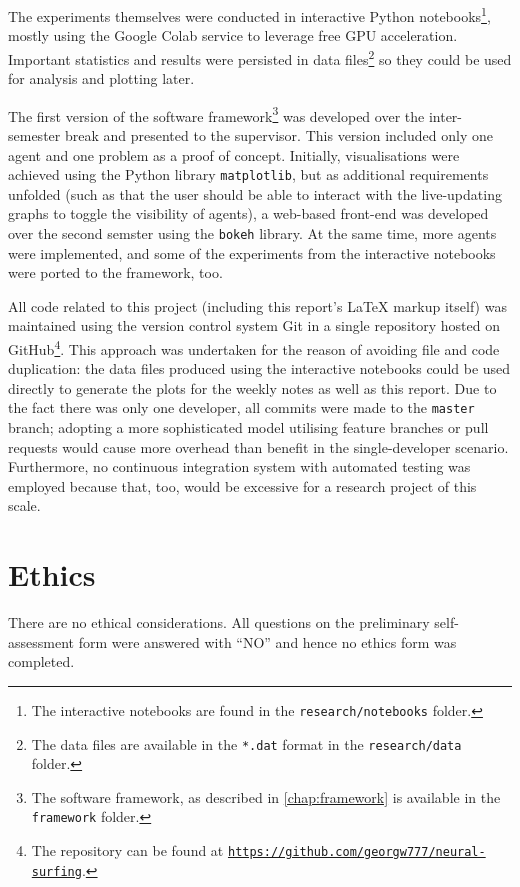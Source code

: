 The experiments themselves were conducted in interactive Python notebooks\footnote{The interactive notebooks are found in the \texttt{research/notebooks} folder.}, mostly using the Google Colab service to leverage free GPU acceleration.
Important statistics and results were persisted in data files\footnote{The data files are available in the \texttt{*.dat} format in the \texttt{research/data} folder.} so they could be used for analysis and plotting later.

The first version of the software framework\footnote{The software framework, as described in \ref{chap:framework} is available in the \texttt{framework} folder.} was developed over the inter-semester break and presented to the supervisor.
This version included only one agent and one problem as a proof of concept. 
Initially, visualisations were achieved using the Python library \texttt{matplotlib}, but as additional requirements unfolded (such as that the user should be able to interact with the live-updating graphs to toggle the visibility of agents), a web-based front-end was developed over the second semster using the \texttt{bokeh} library.
At the same time, more agents were implemented, and some of the experiments from the interactive notebooks were ported to the framework, too.

All code related to this project (including this report's \LaTeX{} markup itself) was maintained using the version control system Git in a single repository hosted on GitHub\footnote{The repository can be found at \href{https://github.com/georgw777/neural-surfing}{\texttt{https://github.com/georgw777/neural-surfing}}.}.
This approach was undertaken for the reason of avoiding file and code duplication: the data files produced using the interactive notebooks could be used directly to generate the plots for the weekly notes as well as this report.
Due to the fact there was only one developer, all commits were made to the \texttt{master} branch; adopting a more sophisticated model utilising feature branches or pull requests would cause more overhead than benefit in the single-developer scenario.
Furthermore, no continuous integration system with automated testing was employed because that, too, would be excessive for a research project of this scale. 

\section{Ethics}
There are no ethical considerations. 
All questions on the preliminary self-assessment form were answered with ``NO'' and hence no ethics form was completed.


